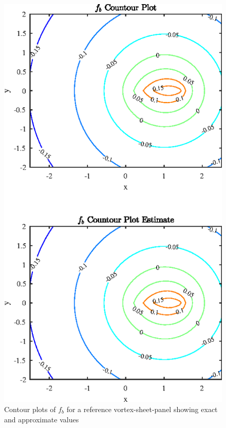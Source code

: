 \begin{figure}[H]
\centering
\includegraphics[scale=1.40]{graphs/e2g2.eps}
\caption{Contour plots of $f_b$ for a reference vortex-sheet-panel showing exact and approximate values}
\label{e2g2}
\end{figure}

\pagebreak